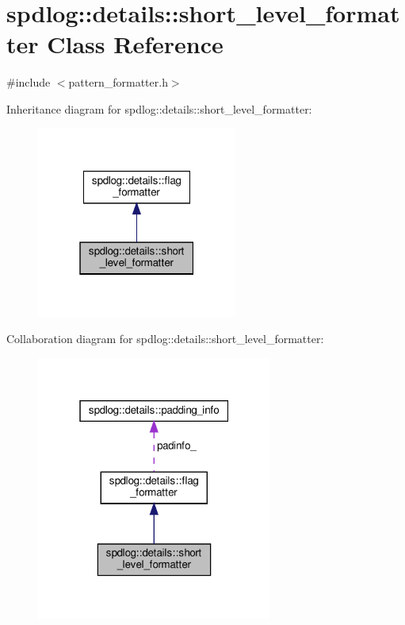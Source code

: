 \hypertarget{classspdlog_1_1details_1_1short__level__formatter}{}\section{spdlog\+:\+:details\+:\+:short\+\_\+level\+\_\+formatter Class Reference}
\label{classspdlog_1_1details_1_1short__level__formatter}


{\ttfamily \#include $<$pattern\+\_\+formatter.\+h$>$}



Inheritance diagram for spdlog\+:\+:details\+:\+:short\+\_\+level\+\_\+formatter\+:
\nopagebreak
\begin{figure}[H]
\begin{center}
\leavevmode
\includegraphics[width=187pt]{classspdlog_1_1details_1_1short__level__formatter__inherit__graph}
\end{center}
\end{figure}


Collaboration diagram for spdlog\+:\+:details\+:\+:short\+\_\+level\+\_\+formatter\+:
\nopagebreak
\begin{figure}[H]
\begin{center}
\leavevmode
\includegraphics[width=220pt]{classspdlog_1_1details_1_1short__level__formatter__coll__graph}
\end{center}
\end{figure}
